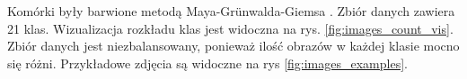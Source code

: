 Komórki były barwione metodą Maya-Grünwalda-Giemsa \cite{histology}. Zbiór danych zawiera 21 klas.
Wizualizacja rozkładu klas jest widoczna na rys. \ref{fig:images_count_vis}.
Zbiór danych jest niezbalansowany, ponieważ ilość obrazów w każdej klasie mocno się różni.
Przykładowe zdjęcia są widoczne na rys \ref{fig:images_examples}.


